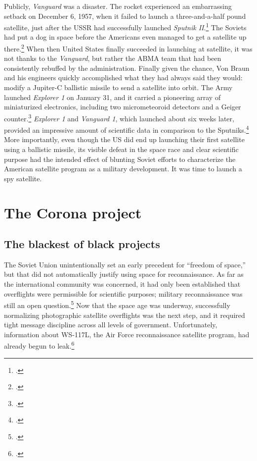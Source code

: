 \documentclass[11pt]{memoir}
\begin{document}
Publicly, \emph{Vanguard} was a disaster. The rocket experienced an embarrassing setback on December 6, 1957, when it failed to launch a three-and-a-half pound satellite, just after the USSR had successfully launched \emph{Sputnik II}.\footcite[p.~119]{killian_sputnik_1977} The Soviets had put a dog in space before the Americans even managed to get a satellite up there.\footcite[Her name was Laika.]{george_sad_2018} When then United States finally succeeded in launching at satellite, it was not thanks to the \emph{Vanguard}, but rather the ABMA team that had been consistently rebuffed by the administration. Finally given the chance, Von Braun and his engineers quickly accomplished what they had always said they would: modify a Jupiter-C ballistic missile to send a satellite into orbit. The Army launched \emph{Explorer 1} on January 31, and it carried a pioneering array of miniaturized electronics, including two micrometeoroid detectors and a Geiger counter.\footcite[p.~168]{mcdougall_heavens_1985} \emph{Explorer 1} and \emph{Vanguard 1}, which launched about six weeks later, provided an impressive amount of scientific data in comparison to the Sputniks.\footcite[p.~168]{mcdougall_heavens_1985} More importantly, even though the US did end up launching their first satellite using a ballistic missile, its visible defeat in the space race and clear scientific purpose had the intended effect of blunting Soviet efforts to characterize the American satellite program as a military development. It was time to launch a spy satellite.

\section{The Corona project}
\subsection{The blackest of black projects}
The Soviet Union unintentionally set an early precedent for ``freedom of space,'' but that did not automatically justify using space for reconnaissance. As far as the international community was concerned, it had only been established that overflights were permissible for scientific purposes; military reconnaissance was still an open question.\footcite[p.~47-48]{peebles_corona_1997} Now that the space age was underway, successfully normalizing photographic satellite overflights was the next step, and it required tight message discipline across all levels of government. Unfortunately, information about WS-117L, the Air Force reconnaissance satellite program, had already begun to leak.\footcite[p.~96]{lindgren_trust_2000}
\end{document}
